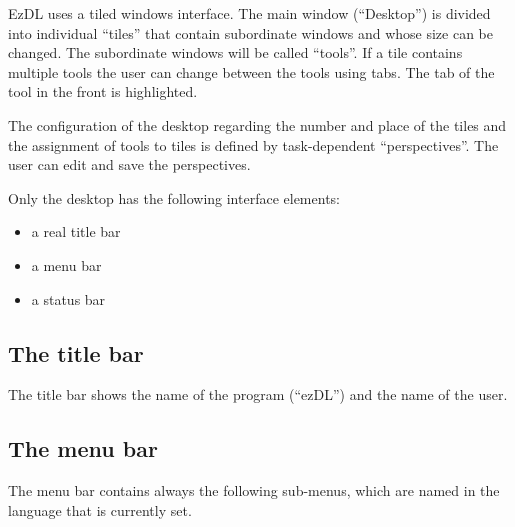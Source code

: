 \documentclass[12pt]{book}
\begin{document}
EzDL uses a tiled windows interface. The main window (``Desktop'') is divided into individual ``tiles'' that contain subordinate windows and whose size can be changed. The subordinate windows will be called ``tools''. If a tile contains multiple tools the user can change between the tools using tabs. The tab of the tool in the front is highlighted.



The configuration of the desktop regarding the number and place of the tiles and the assignment of tools to tiles is defined by task-dependent ``perspectives''. The user can edit and save the perspectives.

Only the desktop has the following interface elements:
\begin{itemize}
\item a real title bar
\item a menu bar
\item a status bar
\end{itemize}


\subsection{The title bar}

The title bar shows the name of the program (``ezDL'') and the name of the user.


\subsection{The menu bar}

The menu bar contains always the following sub-menus, which are named in the language that is currently set.
\end{document}
